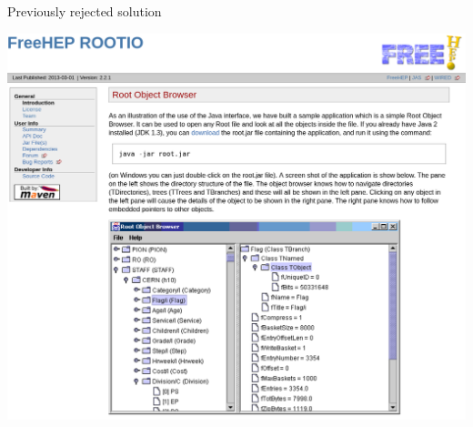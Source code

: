 \documentclass{beamer}
\begin{document}
\begin{frame}{Previously rejected solution}
\vspace{0.25 cm}
\begin{center}
\includegraphics[width=0.9\linewidth]{rootio-screenshot.png}
\end{center}
\end{frame}
\end{document}
